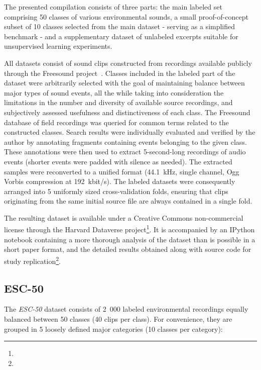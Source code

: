 \documentclass[letterpaper]{sig-alternate}
\begin{document}
The presented compilation consists of three parts: the main labeled set comprising 50 classes of various environmental sounds, a small proof-of-concept subset of 10 classes selected from the main dataset - serving as a simplified benchmark - and a supplementary dataset of unlabeled excerpts suitable for unsupervised learning experiments.

All datasets consist of sound clips constructed from recordings available publicly through the Freesound project~\cite{font2013freesound}. Classes included in the labeled part of the dataset were arbitrarily selected with the goal of maintaining balance between major types of sound events, all the while taking into consideration the limitations in the number and diversity of available source recordings, and subjectively assessed usefulness and distinctiveness of each class. The Freesound database of field recordings was queried for common terms related to the constructed classes. Search results were individually evaluated and verified by the author by annotating fragments containing events belonging to the given class. These annotations were then used to extract 5-second-long recordings of audio events (shorter events were padded with silence as needed). The extracted samples were reconverted to a unified format (44.1~kHz, single channel, Ogg Vorbis compression at 192~kbit/s). The labeled datasets were consequently arranged into 5 uniformly sized cross-validation folds, ensuring that clips originating from the same initial source file are always contained in a single fold.

The resulting dataset is available under a Creative Commons non-commercial license through the Harvard Dataverse project\footnote{}. It is accompanied by an IPython notebook containing a more thorough analysis of the dataset than is possible in a short paper format, and the detailed results obtained along with source code for study replication\footnote{

}.  

\subsection{ESC-50}

The \textit{ESC-50} dataset consists of 2~000 labeled environmental recordings equally balanced between 50 classes (40 clips per class). For convenience, they are grouped in 5 loosely defined major categories (10 classes per category):
\end{document}
